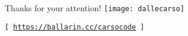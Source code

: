 
\begin{frame}{Thanks for your attention!}
    \centering
    \vspace*{15px}
    \texttt{[image: dallecarso]}
    \vspace*{10px}

    \texttt{[ \href{https://ballarin.cc/carsocode}{https://ballarin.cc/carsocode} ]}
\end{frame}